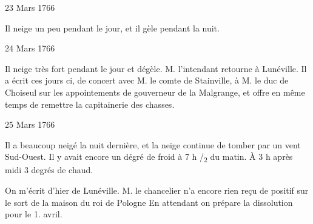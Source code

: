                      
                     \begin{diary}{23 Mars 1766}{}
                        
                         Il neige un peu pendant le jour, et il gèle
                           pendant la nuit. \bigskip
        
        
                     \end{diary}

                     \begin{diary}{24 Mars 1766}{}
                        
                         Il neige très fort pendant le jour et
                           dégèle.
                           M. l'intendant retourne à
                              Lunéville. Il a
                           écrit ces jours ci, de concert avec M. le comte
                              de Stainville, à M. le duc
                              de Choiseul sur les
                           appointements de gouverneur de
                              la Malgrange,
                           et offre en même temps de remettre la capitainerie
                              des chasses. \bigskip
        
        
                     \end{diary}

                     \begin{diary}{25 Mars 1766}{}
                        
                         Il a beaucoup neigé la nuit
                           dernière,
                           et la neige continue de tomber par un vent
                           Sud-Ouest. Il y avait encore un dégré de
                              froid
                           à 7 h /\textsubscript{2} du matin. À 3 h après midi
                           3 degrés
                              de chaud. \bigskip
        
        
                         On m'écrit d'hier de Lunéville. M. le
                              chancelier n'a encore rien reçu de positif
                           sur le sort de la maison du roi
                              de Pologne
                           En attendant on prépare la dissolution
                           pour le 1.
                              avril. \bigskip
        
        
                     \end{diary}


